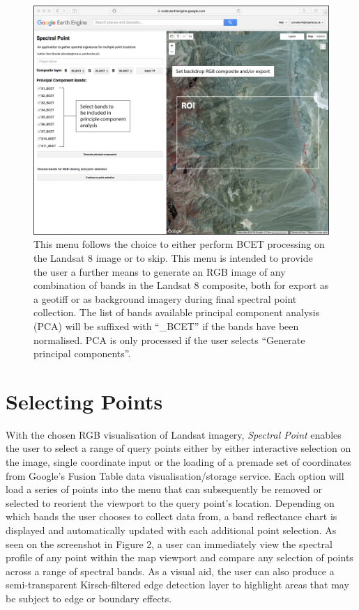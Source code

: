 \documentclass[12pt]{article}
\begin{document}
\begin{figure}[htbp]
\centering
\includegraphics[width=1.0\textwidth]{images/pca_reduced.jpg}
\caption{This menu follows the choice to either perform BCET processing on the Landsat 8 image or to skip. This menu is intended to provide the user a further means to generate an RGB image of any combination of bands in the Landsat 8 composite, both for export as a geotiff or as background imagery during final spectral point collection. The list of bands available principal component analysis (PCA) will be suffixed with ``\_BCET'' if the bands have been normalised. PCA is only processed if the user selects ``Generate principal components''.}
\label{fig:pca}
\end{figure}

\section{Selecting Points}
\label{sec:selecting_points}

With the chosen RGB visualisation of Landsat imagery, \textit{Spectral Point} enables the user to select a range of query points either by either interactive selection on the image, single coordinate input or the loading of a premade set of coordinates from Google's Fusion Table data visualisation/storage service. Each option will load a series of points into the menu that can subsequently be removed or selected to reorient the viewport to the query point’s location. Depending on which bands the user chooses to collect data from, a band reflectance chart is displayed and automatically updated with each additional point selection. As seen on the screenshot in Figure 2, a user can immediately view the spectral profile of any point within the map viewport and compare any selection of points across a range of spectral bands. As a visual aid, the user can also produce a semi-transparent Kirsch-filtered edge detection layer to highlight areas that may be subject to edge or boundary effects.
\end{document}
